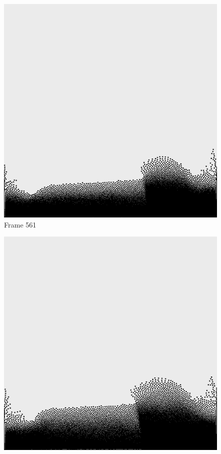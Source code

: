 \documentclass[a4paper, 12pt, oneside]{book}
\begin{document}
\begin{figure}[!ht]
    \addvspace{0.5ex}
        \begin{center}
            \includegraphics[width=\linewidth]{images/test_case_2/561.png}
            Frame 561
        \end{center}
    \endminipage
    \hfill
        \begin{center}
            \includegraphics[width=\linewidth]{images/test_case_2/581.png}

\end{center}
\end{figure}
\end{document}
